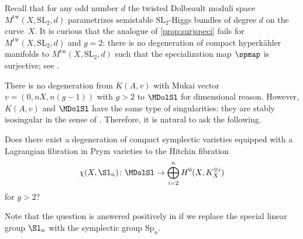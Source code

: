 \begin{rmk}\label{rmk:smoothvssingular} Recall that for any odd number $d$ the twisted Dolbeault moduli space $M^{\mathrm{tw}}(X, \mathrm{SL}_2, d)$ parametrizes semistable $\mathrm{SL}_2$-Higgs bundles of degree $d$ on the curve~$X$. It is curious that the analogue of \cref{prop:surjspeci} fails for $M^{\mathrm{tw}}(X, \mathrm{SL}_2,d)$ and $g=2$: there is no degeneration of compact hyperkähler manifolds to $M^{\mathrm{tw}}(X, \mathrm{SL}_2, d)$ such that the specialization map $\spmap$ is surjective; see \cite[Prop.\,4.3]{deCataldoMaulikShen2020}.
\end{rmk}

\begin{exa}[genus $>2$] There is no degeneration from $K(A,v)$ with Mukai vector $v=(0,nX, n(g-1))$ with $g>2$ to $\MDolSl$ for dimensional reason. However, $K(A,v)$ and $\MDolSl$ have the same type of singularities: they are stably isosingular in the sense of \cite[Def.\,2.6 \& Th.\,2.11]{Mauri2021}. Therefore, it is natural to ask the following.
\begin{question*}
Does there exist a degeneration of compact symplectic varieties equipped with a Lagrangian fibration in Prym varieties to the Hitchin fibration
\[
\chi(X,\Sl_n)\colon \MDolSl \to \bigoplus^{n}_{i=2} H^0(X, K_X^{\otimes i})
\]
for $g>2$?
\end{question*}

Note that the question is answered positively in \cite{SawonShen2021} if we replace the special linear group $\Sl_n$ with the symplectic group $\mathrm{Sp}_n$.
\end{exa}
